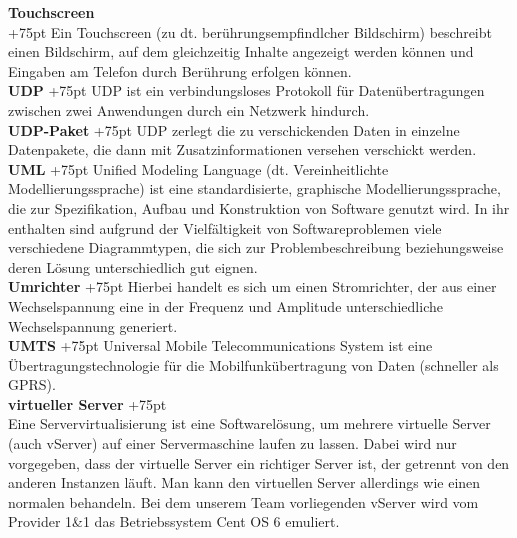 \documentclass[fontsize = 12pt, paper = a4]{scrreprt}
\begin{document}
\textbf{Touchscreen} \\
\hangindent+75pt  
{Ein Touchscreen (zu dt. berührungsempfindlcher Bildschirm) beschreibt einen Bildschirm, auf dem gleichzeitig Inhalte angezeigt werden können und Eingaben am Telefon durch Berührung erfolgen können.\\

\textbf{UDP}
\hangindent+75pt 
\hspace*{13mm}
UDP ist ein verbindungsloses Protokoll für Datenübertragungen zwischen zwei Anwendungen durch ein Netzwerk hindurch.\\

\textbf{UDP-Paket}
\hangindent+75pt 
\hspace*{0mm}
UDP zerlegt die zu verschickenden Daten in einzelne Datenpakete, die dann mit Zusatzinformationen versehen verschickt werden.\\

\textbf{UML}
\hangindent+75pt 
\hspace*{13mm}
Unified Modeling Language (dt. Vereinheitlichte Modellierungssprache)  ist eine standardisierte, graphische Modellierungssprache, die zur Spezifikation, Aufbau und Konstruktion von Software genutzt wird. In ihr enthalten sind aufgrund der Vielfältigkeit von Softwareproblemen viele verschiedene Diagrammtypen, die sich zur Problembeschreibung beziehungsweise deren Lösung unterschiedlich gut eignen.\\

\textbf{Umrichter}
\hangindent+75pt 
\hspace*{2.5mm}
Hierbei handelt es sich um einen Stromrichter, der aus einer Wechselspannung eine in der Frequenz und Amplitude unterschiedliche Wechselspannung generiert.\\

\textbf{UMTS}
\hangindent+75pt 
\hspace*{10.5mm}
Universal Mobile Telecommunications System ist eine Übertragungstechnologie für die Mobilfunkübertragung von Daten (schneller als GPRS).\\

\textbf{virtueller Server}
\hangindent+75pt 
\\
Eine Servervirtualisierung ist eine Softwarelösung, um mehrere virtuelle Server (auch vServer) auf einer Servermaschine laufen zu lassen. Dabei wird nur vorgegeben, dass der virtuelle Server ein richtiger Server ist, der getrennt von den anderen Instanzen läuft. Man kann den virtuellen Server allerdings wie einen normalen behandeln. Bei dem unserem Team vorliegenden vServer wird vom Provider 1\&1 das Betriebssystem Cent OS 6 emuliert.\\

}
\end{document}

